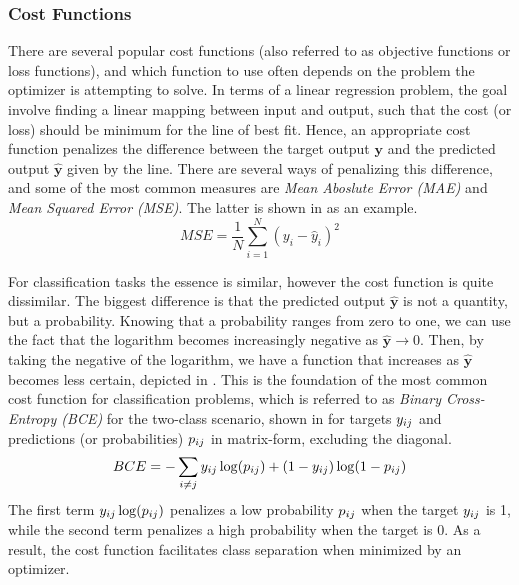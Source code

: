     \subsubsection{Cost Functions}
    
        There are several popular cost functions (also referred to as objective functions or loss functions), and which function to use often depends on the problem the optimizer is attempting to solve. 
        In terms of a linear regression problem, the goal involve finding a linear mapping between input and output, such that the cost (or loss) should be minimum for the line of best fit. Hence, an appropriate cost function penalizes the difference between the target output $\bm{y}$ and the predicted output $\bm{\hat{y}}$ given by the line. 
        There are several ways of penalizing this difference, and some of the most common measures are \emph{Mean Aboslute Error (MAE)} and \emph{Mean Squared Error (MSE)}. The latter is shown in  as an example.
        \begin{equation}\label{eq:mopt-mseloss}
            MSE = \frac{1}{N}\sum_{i=1}^N(y_i-\hat{y}_i)^2
        \end{equation}
        
        For classification tasks the essence is similar, however the cost function is quite dissimilar. The biggest difference is that the predicted output $\bm{\hat{y}}$ is not a quantity, but a probability. Knowing that a probability ranges from zero to one, we can use the fact that the logarithm becomes increasingly negative as $\bm{\hat{y}}\rightarrow0$. Then, by taking the negative of the logarithm, we have a function that increases as $\bm{\hat{y}}$ becomes less certain, depicted in .
        This is the foundation of the most common cost function for classification problems, which is referred to as \emph{Binary Cross-Entropy (BCE)} for the two-class scenario, shown in  for targets $\sub(y)$ and predictions (or probabilities) $\sub(p)$ in matrix-form, excluding the diagonal.
        \begin{equation}\label{eq:mopt-bceloss}
            BCE = -\sum_{i\neq j} \sub(y)\log(\sub(p))+(1-\sub(y))\log(1-\sub(p))
        \end{equation}
        The first term $\sub(y)\log(\sub(p))$ penalizes a low probability $\sub(p)$ when the target $\sub(y)$ is 1, while the second term penalizes a high probability when the target is 0. As a result, the cost function facilitates class separation when minimized by an optimizer.
        

